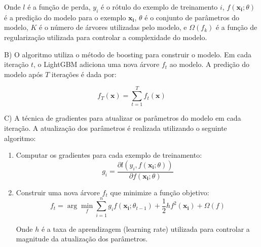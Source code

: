 Onde $l$ é a função de perda, $y_i$ é o rótulo do exemplo de treinamento $i$, $f(\mathbf{x_i};\theta)$ é a predição do modelo para o exemplo $\mathbf{x_i}$, $\theta$ é o conjunto de parâmetros do modelo, $K$ é o número de árvores utilizadas pelo modelo, e $\Omega(f_k)$ é a função de regularização utilizada para controlar a complexidade do modelo.

B) O algoritmo utiliza o método de boosting para construir o modelo. Em cada iteração $t$, o LightGBM adiciona uma nova árvore $f_t$ ao modelo. A predição do modelo após $T$ iterações é dada por:

\begin{equation}
    f_T(\mathbf{x}) = \sum_{t=1}^T f_t(\mathbf{x})
\end{equation}

C) A técnica de gradientes para atualizar os parâmetros do modelo em cada iteração. A atualização dos parâmetros é realizada utilizando o seguinte algoritmo:

\begin{enumerate}
    \item Computar os gradientes para cada exemplo de treinamento:
          \begin{equation}
              g_i = \frac{\partial l(y_i, f(\mathbf{x_i};\theta))}{\partial f(\mathbf{x_i};\theta)}
          \end{equation}
    \item Construir uma nova árvore $f_t$ que minimize a função objetivo:
          \begin{equation}
              f_t = \arg \min_{f} \sum_{i=1}^n g_i f(\mathbf{x_i};\theta_{t-1}) + \frac{1}{2} h f^2(\mathbf{x_i}) + \Omega(f)
          \end{equation}

          Onde $h$ é a taxa de aprendizagem (learning rate) utilizada para controlar a magnitude da atualização dos parâmetros.
\end{enumerate}